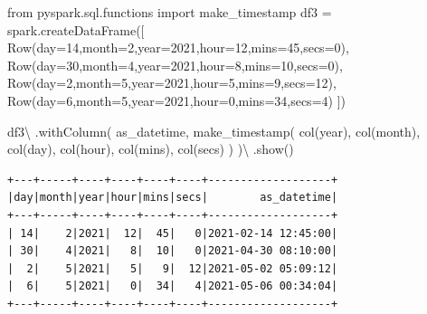 \documentclass[
  11pt,
  letterpaper,
  DIV=11,
  numbers=noendperiod]{scrreprt}
\newenvironment{Shaded}{\begin{snugshade}}{\end{snugshade}}
\newcommand{\DecValTok}[1]{\textcolor[rgb]{0.68,0.00,0.00}{#1}}
\newcommand{\ImportTok}[1]{\textcolor[rgb]{0.00,0.46,0.62}{#1}}
\newcommand{\NormalTok}[1]{\textcolor[rgb]{0.00,0.23,0.31}{#1}}
\newcommand{\OperatorTok}[1]{\textcolor[rgb]{0.37,0.37,0.37}{#1}}
\newcommand{\StringTok}[1]{\textcolor[rgb]{0.13,0.47,0.30}{#1}}
\begin{document}
\begin{Shaded}
\begin{Highlighting}[]
\ImportTok{from}\NormalTok{ pyspark.sql.functions }\ImportTok{import}\NormalTok{ make\_timestamp}
\NormalTok{df3 }\OperatorTok{=}\NormalTok{ spark.createDataFrame([}
\NormalTok{    Row(day}\OperatorTok{=}\DecValTok{14}\NormalTok{,month}\OperatorTok{=}\DecValTok{2}\NormalTok{,year}\OperatorTok{=}\DecValTok{2021}\NormalTok{,hour}\OperatorTok{=}\DecValTok{12}\NormalTok{,mins}\OperatorTok{=}\DecValTok{45}\NormalTok{,secs}\OperatorTok{=}\DecValTok{0}\NormalTok{),}
\NormalTok{    Row(day}\OperatorTok{=}\DecValTok{30}\NormalTok{,month}\OperatorTok{=}\DecValTok{4}\NormalTok{,year}\OperatorTok{=}\DecValTok{2021}\NormalTok{,hour}\OperatorTok{=}\DecValTok{8}\NormalTok{,mins}\OperatorTok{=}\DecValTok{10}\NormalTok{,secs}\OperatorTok{=}\DecValTok{0}\NormalTok{),}
\NormalTok{    Row(day}\OperatorTok{=}\DecValTok{2}\NormalTok{,month}\OperatorTok{=}\DecValTok{5}\NormalTok{,year}\OperatorTok{=}\DecValTok{2021}\NormalTok{,hour}\OperatorTok{=}\DecValTok{5}\NormalTok{,mins}\OperatorTok{=}\DecValTok{9}\NormalTok{,secs}\OperatorTok{=}\DecValTok{12}\NormalTok{),}
\NormalTok{    Row(day}\OperatorTok{=}\DecValTok{6}\NormalTok{,month}\OperatorTok{=}\DecValTok{5}\NormalTok{,year}\OperatorTok{=}\DecValTok{2021}\NormalTok{,hour}\OperatorTok{=}\DecValTok{0}\NormalTok{,mins}\OperatorTok{=}\DecValTok{34}\NormalTok{,secs}\OperatorTok{=}\DecValTok{4}\NormalTok{)}
\NormalTok{])}

\NormalTok{df3}\OperatorTok{\textbackslash{}}
\NormalTok{    .withColumn(}
        \StringTok{\textquotesingle{}as\_datetime\textquotesingle{}}\NormalTok{,}
\NormalTok{        make\_timestamp(}
\NormalTok{            col(}\StringTok{\textquotesingle{}year\textquotesingle{}}\NormalTok{),}
\NormalTok{            col(}\StringTok{\textquotesingle{}month\textquotesingle{}}\NormalTok{),}
\NormalTok{            col(}\StringTok{\textquotesingle{}day\textquotesingle{}}\NormalTok{),}
\NormalTok{            col(}\StringTok{\textquotesingle{}hour\textquotesingle{}}\NormalTok{),}
\NormalTok{            col(}\StringTok{\textquotesingle{}mins\textquotesingle{}}\NormalTok{),}
\NormalTok{            col(}\StringTok{\textquotesingle{}secs\textquotesingle{}}\NormalTok{)}
\NormalTok{        )}
\NormalTok{    )}\OperatorTok{\textbackslash{}}
\NormalTok{    .show()}
\end{Highlighting}
\end{Shaded}

\begin{verbatim}
+---+-----+----+----+----+----+-------------------+
|day|month|year|hour|mins|secs|        as_datetime|
+---+-----+----+----+----+----+-------------------+
| 14|    2|2021|  12|  45|   0|2021-02-14 12:45:00|
| 30|    4|2021|   8|  10|   0|2021-04-30 08:10:00|
|  2|    5|2021|   5|   9|  12|2021-05-02 05:09:12|
|  6|    5|2021|   0|  34|   4|2021-05-06 00:34:04|
+---+-----+----+----+----+----+-------------------+
\end{verbatim}
\end{document}
